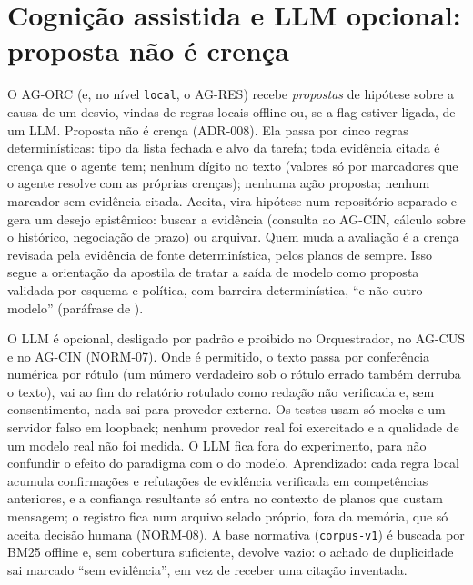 \documentclass[10pt,a4paper]{article}
\newcommand{\code}[1]{\texttt{#1}}
\begin{document}
\section{Cognição assistida e LLM opcional: proposta não é crença}
O AG-ORC (e, no nível \code{local}, o AG-RES) recebe \emph{propostas} de hipótese sobre a causa de um desvio, vindas
de regras locais offline ou, se a flag estiver ligada, de um LLM. Proposta não é crença (ADR-008). Ela passa por
cinco regras determinísticas: tipo da lista fechada e alvo da tarefa; toda evidência citada é crença que o agente tem;
nenhum dígito no texto (valores só por marcadores que o agente resolve com as próprias crenças); nenhuma ação proposta;
nenhum marcador sem evidência citada. Aceita, vira hipótese num repositório separado e gera um desejo epistêmico:
buscar a evidência (consulta ao AG-CIN, cálculo sobre o histórico, negociação de prazo) ou arquivar. Quem muda a
avaliação é a crença revisada pela evidência de fonte determinística, pelos planos de sempre. Isso segue a orientação
da apostila de tratar a saída de modelo como proposta validada por esquema e política, com barreira determinística,
\enquote{e não outro modelo} (paráfrase de \cite{cancian2026}).

O LLM é opcional, desligado por padrão e proibido no Orquestrador, no AG-CUS e no AG-CIN (NORM-07). Onde é permitido,
o texto passa por conferência numérica por rótulo (um número verdadeiro sob o rótulo errado também derruba o texto),
vai ao fim do relatório rotulado como redação não verificada e, sem consentimento, nada sai para provedor externo. Os
testes usam só mocks e um servidor falso em loopback; nenhum provedor real foi exercitado e a qualidade de um modelo
real não foi medida. O LLM fica fora do experimento, para não confundir o efeito do paradigma com o do modelo.
Aprendizado: cada regra local acumula confirmações e refutações de evidência verificada em competências anteriores, e
a confiança resultante só entra no contexto de planos que custam mensagem; o registro fica num arquivo selado próprio,
fora da memória, que só aceita decisão humana (NORM-08). A base normativa (\code{corpus-v1}) é buscada por BM25 offline
\parencite{robertson2009} e, sem cobertura suficiente, devolve vazio: o achado de duplicidade sai marcado \enquote{sem
evidência}, em vez de receber uma citação inventada.

\end{document}
